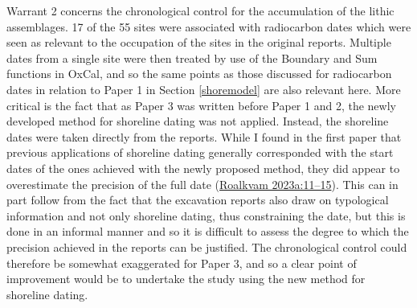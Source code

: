 \documentclass[
  12pt,
  a4paper,
  oneside]{book}
\begin{document}
Warrant 2 concerns the chronological control for the accumulation of the lithic assemblages. 17 of the 55 sites were associated with radiocarbon dates which were seen as relevant to the occupation of the sites in the original reports. Multiple dates from a single site were then treated by use of the Boundary and Sum functions in OxCal, and so the same points as those discussed for radiocarbon dates in relation to Paper 1 in Section \ref{shoremodel} are also relevant here. More critical is the fact that as Paper 3 was written before Paper 1 and 2, the newly developed method for shoreline dating was not applied. Instead, the shoreline dates were taken directly from the reports. While I found in the first paper that previous applications of shoreline dating generally corresponded with the start dates of the ones achieved with the newly proposed method, they did appear to overestimate the precision of the full date (\protect\hyperlink{ref-roalkvam2023}{Roalkvam 2023a:11--15}). This can in part follow from the fact that the excavation reports also draw on typological information and not only shoreline dating, thus constraining the date, but this is done in an informal manner and so it is difficult to assess the degree to which the precision achieved in the reports can be justified. The chronological control could therefore be somewhat exaggerated for Paper 3, and so a clear point of improvement would be to undertake the study using the new method for shoreline dating.
\end{document}
